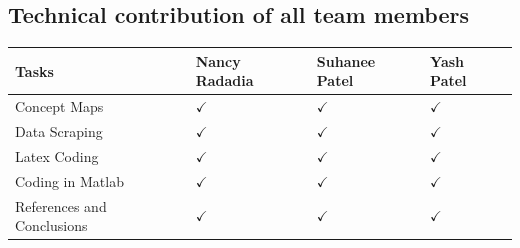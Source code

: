 \documentclass{article}
\begin{document}
\subsection{Technical contribution of all team members }
\begin{table}[h]
	\centering
	\begin{tabular}{|l|l|l|l|}
		\hline
		Tasks  & Nancy Radadia & Suhanee Patel & Yash Patel      \\ \hline
		Concept Maps & \hspace{1cm}$ \checkmark $&       \hspace{1cm}$ \checkmark $        &     \hspace{0.7cm}$ \checkmark $            \\ \hline
		Data Scraping &    \hspace{1cm}$ \checkmark $           &     \hspace{1cm}$ \checkmark $          &      \hspace{0.7cm}$ \checkmark $         \\ \hline
		Latex Coding &   \hspace{1cm}$ \checkmark $            &   \hspace{1cm}$ \checkmark $             &  \hspace{0.7cm}$ \checkmark $              \\ \hline
		Coding in Matlab &  \hspace{1cm}$ \checkmark $              &   \hspace{1cm}$ \checkmark $ &  \hspace{0.7cm}$ \checkmark $              \\ \hline
		References and Conclusions & \hspace{1cm}$ \checkmark $ & \hspace{1cm}$ \checkmark $              &    \hspace{0.7cm}$ \checkmark $           \\ \hline
	\end{tabular}
\end{table}
\end{document}
